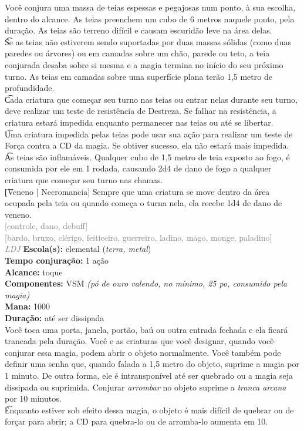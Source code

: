 \documentclass{RPG_Adventure}[2021/10/20]
\begin{document}
{\normalsize Você conjura uma massa de teias espessas e pegajosas num ponto, à sua escolha, dentro do alcance. As teias preenchem um cubo de 6 metros naquele ponto, pela duração. As teias são terreno difícil e causam escuridão leve na área delas.\\\t Se as teias não estiverem sendo suportadas por duas massas sólidas (como duas paredes ou árvores) ou em camadas sobre um chão, parede ou teto, a teia conjurada desaba sobre si mesma e a magia termina no início do seu próximo turno. As teias em camadas sobre uma superfície plana terão 1,5 metro de profundidade.\\\t Cada criatura que começar seu turno nas teias ou entrar nelas durante seu turno, deve realizar um teste de resistência de Destreza. Se falhar na resistência, a criatura estará impedida enquanto permanecer nas teias ou até se libertar.\\\t Uma criatura impedida pelas teias pode usar sua ação para realizar um teste de Força contra a CD da magia. Se obtiver sucesso, ela não estará mais impedida.\\\t As teias são inflamáveis. Qualquer cubo de 1,5 metro de teia exposto ao fogo, é consumida por ele em 1 rodada, causando 2d4 de dano de fogo a qualquer criatura que começar seu turno nas chamas.\\\t [Veneno | Necromancia] Sempre que uma criatura se move dentro da área ocupada pela teia ou quando começa o turna nela, ela recebe 1d4 de dano de veneno.\\}
{\scriptsize \textcolor{gray}{[controle, dano, debuff]\\}}
{\scriptsize \textcolor{gray}{[bardo, bruxo, clérigo, feiticeiro, guerreiro, ladino, mago, monge, paladino]\\}}
{\tiny \textcolor{gray}{\textit{LDJ}}}\jump{}
{\small \t \textbf{Escola(s):} elemental (\textit{terra, metal})\\\t \textbf{Tempo conjuração:} 1 ação\\\t \textbf{Alcance:} toque\\\t \textbf{Componentes:} VSM \textit{(pó de ouro valendo, no mínimo, 25 po, consumido pela magia)}\\\t \textbf{Mana:} 1000\\\t \textbf{Duração:} até ser dissipada\\}
{\normalsize Você toca uma porta, janela, portão, baú ou outra entrada fechada e ela ficará trancada pela duração. Você e as criaturas que você designar, quando você conjurar essa magia, podem abrir o objeto normalmente. Você também pode definir uma senha que, quando falada a 1,5 metro do objeto, suprime a magia por 1 minuto. De outra forma, ele é intransponível até ser quebrado ou a magia seja dissipada ou suprimida. Conjurar \textit{arrombar} no objeto suprime a \textit{tranca arcana} por 10 minutos.\\\t Enquanto estiver sob efeito dessa magia, o objeto é mais difícil de quebrar ou de forçar para abrir; a CD para quebra-lo ou de arromba-lo aumenta em 10.\\}
\end{document}
